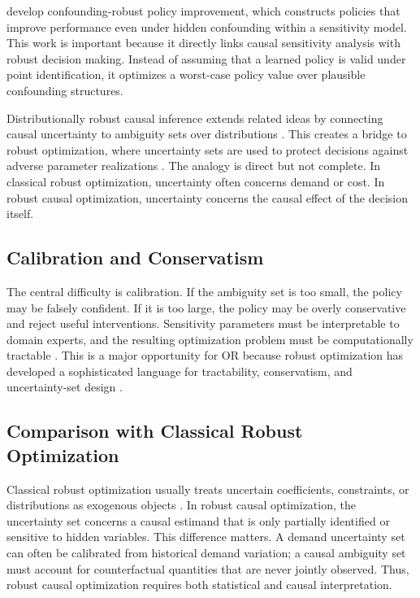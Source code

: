 \documentclass[11pt]{article}
\begin{document}
\citet{kallus2018confounding} develop confounding-robust policy improvement, which constructs policies that improve performance even under hidden confounding within a sensitivity model. This work is important because it directly links causal sensitivity analysis with robust decision making. Instead of assuming that a learned policy is valid under point identification, it optimizes a worst-case policy value over plausible confounding structures.

Distributionally robust causal inference extends related ideas by connecting causal uncertainty to ambiguity sets over distributions \citep{duchi2023drocausal}. This creates a bridge to robust optimization, where uncertainty sets are used to protect decisions against adverse parameter realizations \citep{ben2009robust,bertsimas2011theory}. The analogy is direct but not complete. In classical robust optimization, uncertainty often concerns demand or cost. In robust causal optimization, uncertainty concerns the causal effect of the decision itself.

\subsection{Calibration and Conservatism}

The central difficulty is calibration. If the ambiguity set is too small, the policy may be falsely confident. If it is too large, the policy may be overly conservative and reject useful interventions. Sensitivity parameters must be interpretable to domain experts, and the resulting optimization problem must be computationally tractable \citep{rosenbaum2002observational,kallus2018confounding}. This is a major opportunity for OR because robust optimization has developed a sophisticated language for tractability, conservatism, and uncertainty-set design \citep{ben2009robust,bertsimas2011theory}.

\subsection{Comparison with Classical Robust Optimization}

Classical robust optimization usually treats uncertain coefficients, constraints, or distributions as exogenous objects \citep{ben2009robust,bertsimas2011theory}. In robust causal optimization, the uncertainty set concerns a causal estimand that is only partially identified or sensitive to hidden variables. This difference matters. A demand uncertainty set can often be calibrated from historical demand variation; a causal ambiguity set must account for counterfactual quantities that are never jointly observed. Thus, robust causal optimization requires both statistical and causal interpretation.
\end{document}
